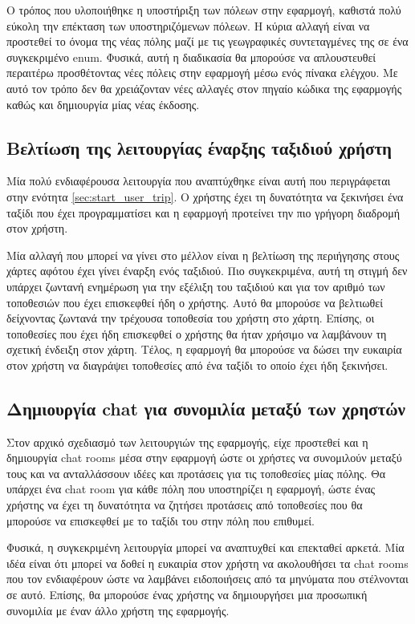 \documentclass[oneside, 12pt]{book}
\begin{document}
Ο τρόπος που υλοποιήθηκε η υποστήριξη των πόλεων στην εφαρμογή, 
καθιστά πολύ εύκολη την επέκταση των υποστηριζόμενων πόλεων. 
Η κύρια αλλαγή είναι να προστεθεί το όνομα της νέας πόλης μαζί με 
τις γεωγραφικές συντεταγμένες της σε ένα συγκεκριμένο enum.
Φυσικά, αυτή η διαδικασία θα μπορούσε να απλουστευθεί περαιτέρω προσθέτοντας νέες πόλεις στην εφαρμογή μέσω ενός πίνακα ελέγχου. Με αυτό τον τρόπο δεν θα χρειάζονταν νέες αλλαγές στον πηγαίο κώδικα της εφαρμογής καθώς και δημιουργία μίας νέας έκδοσης.
\subsection{Βελτίωση της λειτουργίας έναρξης ταξιδιού χρήστη}
Μία πολύ ενδιαφέρουσα λειτουργία που αναπτύχθηκε είναι αυτή που 
περιγράφεται στην ενότητα \ref{sec:start_user_trip}. Ο χρήστης έχει 
τη δυνατότητα να ξεκινήσει ένα ταξίδι που έχει προγραμματίσει και η 
εφαρμογή προτείνει την πιο γρήγορη διαδρομή στον χρήστη.

Μία αλλαγή που μπορεί να γίνει στο μέλλον είναι η βελτίωση της 
περιήγησης στους χάρτες αφότου έχει γίνει έναρξη ενός ταξιδιού. Πιο 
συγκεκριμένα, αυτή τη στιγμή δεν υπάρχει ζωντανή ενημέρωση για την 
εξέλιξη του ταξιδιού και για τον αριθμό των τοποθεσιών που έχει 
επισκεφθεί ήδη ο χρήστης. Αυτό θα μπορούσε να βελτιωθεί δείχνοντας 
ζωντανά την τρέχουσα τοποθεσία του χρήστη στο χάρτη. Επίσης, οι 
τοποθεσίες που έχει ήδη επισκεφθεί ο χρήστης θα ήταν χρήσιμο να 
λαμβάνουν τη σχετική ένδειξη στον χάρτη. Τέλος, η εφαρμογή θα 
μπορούσε να δώσει την ευκαιρία στον χρήστη να διαγράψει τοποθεσίες 
από ένα ταξίδι το οποίο έχει ήδη ξεκινήσει.

\subsection{Δημιουργία chat για συνομιλία μεταξύ των χρηστών}
Στον αρχικό σχεδιασμό των λειτουργιών της εφαρμογής, είχε προστεθεί 
και η δημιουργία chat rooms μέσα στην εφαρμογή ώστε οι χρήστες να 
συνομιλούν μεταξύ τους και να ανταλλάσσουν ιδέες και προτάσεις για 
τις τοποθεσίες μίας πόλης. Θα υπάρχει ένα chat room για κάθε πόλη 
που υποστηρίζει η εφαρμογή, ώστε ένας χρήστης να έχει τη δυνατότητα 
να ζητήσει προτάσεις από τοποθεσίες που θα μπορούσε να επισκεφθεί 
με το ταξίδι του στην πόλη που επιθυμεί. 

Φυσικά, η συγκεκριμένη λειτουργία μπορεί να αναπτυχθεί και 
επεκταθεί αρκετά. Μία ιδέα είναι ότι μπορεί να δοθεί η ευκαιρία 
στον χρήστη να ακολουθήσει τα chat rooms που τον ενδιαφέρουν ώστε 
να λαμβάνει ειδοποιήσεις από τα μηνύματα που στέλνονται σε αυτό. 
Επίσης, θα μπορούσε ένας χρήστης να δημιουργήσει μια προσωπική 
συνομιλία με έναν άλλο χρήστη της εφαρμογής.
\end{document}
